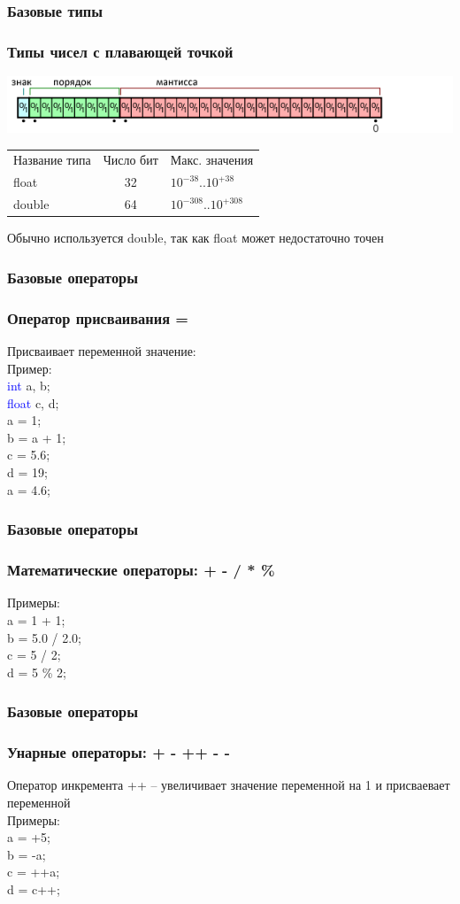 \documentclass[12pt,pdf,hyperref={unicode}]{beamer}
\begin{document}
\begin{frame}
\frametitle{Базовые типы}
\frametitle{Типы чисел с плавающей точкой} 
\includegraphics[scale=0.6]{floats.png}
\begin{center}
\begin{tabular}{ l c l }
  Название типа & Число бит & Макс. значения \\
  float & 32 & $10^{-38}$..$10^{+38}$ \\
  double & 64 & $10^{-308}$..$10^{+308}$ \\
\end{tabular}
\end{center}
Обычно используется double, так как float может недостаточно точен
\end{frame}

\begin{frame}
\frametitle{Базовые операторы}
\frametitle{Оператор присваивания =} 
Присваивает переменной значение:\\
Пример:\\
\quad \textcolor{blue}{int} a, b;\\
\quad \textcolor{blue}{float} c, d;\\
\quad a = 1;\\
\quad b = a + 1;\\
\quad c = 5.6;\\
\quad d = 19;\\
\quad a = 4.6;\\

\end{frame}


\begin{frame}
\frametitle{Базовые операторы}
\frametitle{Математические операторы: + - / * \%} 
Примеры:\\
\quad a = 1 + 1; \\
\quad b = 5.0 / 2.0;\\
\quad c = 5 / 2;\\
\quad d = 5 \% 2;\\
\end{frame}

\begin{frame}
\frametitle{Базовые операторы}
\frametitle{Унарные операторы: + - ++ - -}
Оператор инкремента ++ -- увеличивает значение переменной на 1 и присваевает переменной  \\
Примеры:\\
\quad a = +5; \\
\quad b = -a;\\
\quad c = ++a;\\
\quad d = c++;\\
\end{frame}
\end{document}
